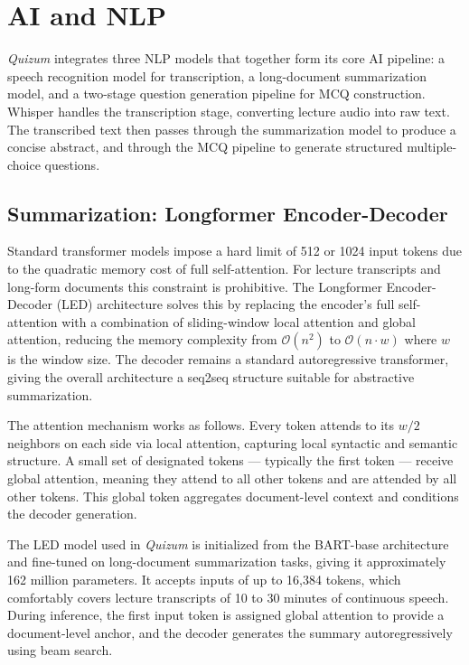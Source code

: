 \section{AI and NLP}

\textit{Quizum} integrates three NLP models that together form its core AI pipeline: a speech recognition model for transcription, a long-document summarization model, and a two-stage question generation pipeline for MCQ construction. Whisper handles the transcription stage, converting lecture audio into raw text. The transcribed text then passes through the summarization model to produce a concise abstract, and through the MCQ pipeline to generate structured multiple-choice questions.

\subsection{Summarization: Longformer Encoder-Decoder}

Standard transformer models impose a hard limit of 512 or 1024 input tokens due to the quadratic memory cost of full self-attention. For lecture transcripts and long-form documents this constraint is prohibitive. The Longformer Encoder-Decoder (LED) architecture solves this by replacing the encoder's full self-attention with a combination of sliding-window local attention and global attention, reducing the memory complexity from $\mathcal{O}(n^2)$ to $\mathcal{O}(n \cdot w)$ where $w$ is the window size. The decoder remains a standard autoregressive transformer, giving the overall architecture a seq2seq structure suitable for abstractive summarization.

The attention mechanism works as follows. Every token attends to its $w/2$ neighbors on each side via local attention, capturing local syntactic and semantic structure. A small set of designated tokens — typically the first token — receive global attention, meaning they attend to all other tokens and are attended by all other tokens. This global token aggregates document-level context and conditions the decoder generation.

The LED model used in \textit{Quizum} is initialized from the BART-base architecture and fine-tuned on long-document summarization tasks, giving it approximately 162 million parameters. It accepts inputs of up to 16,384 tokens, which comfortably covers lecture transcripts of 10 to 30 minutes of continuous speech. During inference, the first input token is assigned global attention to provide a document-level anchor, and the decoder generates the summary autoregressively using beam search.

